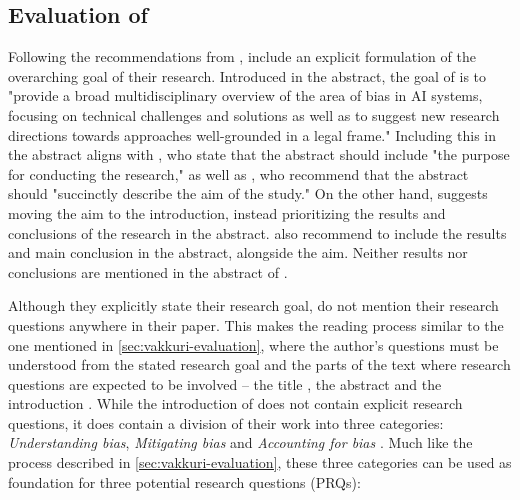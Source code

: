 \subsection[Evaluation of Ntoutsi et al. (2020)]{Evaluation of \textcite{Ntoutsi_2020}}
Following the recommendations from \textcite{Cuschieri_2019,Davidson_2012}, \textcite{Ntoutsi_2020} include an explicit formulation of the overarching goal of their research. Introduced in the abstract, the goal of \textcite[p.1]{Ntoutsi_2020} is to "provide a broad multidisciplinary overview of the area of bias in AI systems, focusing on technical challenges and solutions as well as to suggest new research directions towards approaches well-grounded in a legal frame." Including this in the abstract aligns with \textcite[p.115]{Cuschieri_2019}, who state that the abstract should include "the purpose for conducting the research," as well as \textcite[p.359]{Davidson_2012}, who recommend that the abstract should "succinctly describe the aim of the study." On the other hand, \textcite{Jha_2014,Katz_2006,Lin_2012,Rosenfeldt_2000} suggests moving the aim to the introduction, instead prioritizing the results and conclusions of the research in the abstract. \textcite[p.115]{Cuschieri_2019} also recommend to include the results and main conclusion in the abstract, alongside the aim. Neither results nor conclusions are mentioned in the abstract of \textcite{Ntoutsi_2020}.

Although they explicitly state their research goal, \textcite{Ntoutsi_2020} do not mention their research questions anywhere in their paper. This makes the reading process similar to the one mentioned in \autoref{sec:vakkuri-evaluation}, where the author's questions must be understood from the stated research goal and the parts of the text where research questions are expected to be involved -- the title \parencite[p.359]{Davidson_2012}, the abstract \parencite[p.115]{Cuschieri_2019} and the introduction \parencite[p.2]{Jha_2014}. While the introduction of \textcite{Ntoutsi_2020} does not contain explicit research questions, it does contain a division of their work into three categories: \textit{Understanding bias}, \textit{Mitigating bias} and \textit{Accounting for bias} \parencite[p.2]{Ntoutsi_2020}. Much like the process described in \autoref{sec:vakkuri-evaluation}, these three categories can be used as foundation for three potential research questions (PRQs):

